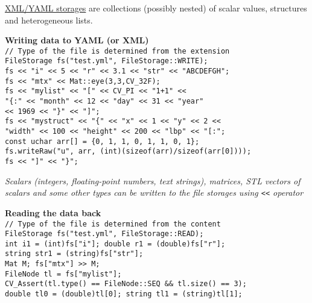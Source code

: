 \documentclass[10pt,landscape]{article}
\begin{document}
\begin{multicols}{3}
\href{http://opencv.willowgarage.com/documentation/cpp/xml_yaml_persistence.html\#filestorage}{XML/YAML storages} are collections (possibly nested) of scalar values, structures and heterogeneous lists.

\begin{tabbing}
\textbf{Wr}\=\textbf{iting data to YAML (or XML)}\\
\texttt{// Type of the file is determined from the extension}\\
\texttt{FileStorage fs("test.yml", FileStorage::WRITE);}\\
\texttt{fs << "i" << 5 << "r" << 3.1 << "str" << "ABCDEFGH";}\\
\texttt{fs << "mtx" << Mat::eye(3,3,CV\_32F);}\\
\texttt{fs << "mylist" << "[" << CV\_PI << "1+1" <<}\\
\>\texttt{"\{:" << "month" << 12 << "day" << 31 << "year"}\\
\>\texttt{<< 1969 << "\}" << "]";}\\
\texttt{fs << "mystruct" << "\{" << "x" << 1 << "y" << 2 <<}\\
\>\texttt{"width" << 100 << "height" << 200 << "lbp" << "[:";}\\
\texttt{const uchar arr[] = \{0, 1, 1, 0, 1, 1, 0, 1\};}\\
\texttt{fs.writeRaw("u", arr, (int)(sizeof(arr)/sizeof(arr[0])));}\\
\texttt{fs << "]" << "\}";}
\end{tabbing}

\emph{Scalars (integers, floating-point numbers, text strings), matrices, STL vectors of scalars and some other types can be written to the file storages using \texttt{<<} operator}

\begin{tabbing}
\textbf{Re}\=\textbf{ading the data back}\\
\texttt{// Type of the file is determined from the content}\\
\texttt{FileStorage fs("test.yml", FileStorage::READ);}\\
\texttt{int i1 = (int)fs["i"]; double r1 = (double)fs["r"];}\\
\texttt{string str1 = (string)fs["str"];}\\

\texttt{Mat M; fs["mtx"] >> M;}\\

\texttt{FileNode tl = fs["mylist"];}\\
\texttt{CV\_Assert(tl.type() == FileNode::SEQ \&\& tl.size() == 3);}\\
\texttt{double tl0 = (double)tl[0]; string tl1 = (string)tl[1];}\\


\end{tabbing}
\end{multicols}
\end{document}
